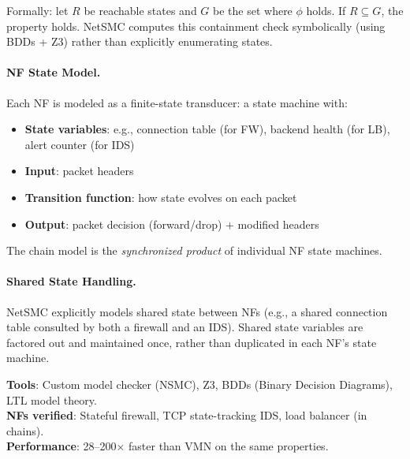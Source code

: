 Formally: let $R$ be reachable states and $G$ be the set where $\phi$ holds. If $R \subseteq G$, the property holds. NetSMC computes this containment check symbolically (using BDDs + Z3) rather than explicitly enumerating states.

\paragraph{NF State Model.}
Each NF is modeled as a finite-state transducer: a state machine with:
\begin{itemize}
  \item \textbf{State variables}: e.g., connection table (for FW), backend health (for LB), alert counter (for IDS)
  \item \textbf{Input}: packet headers
  \item \textbf{Transition function}: how state evolves on each packet
  \item \textbf{Output}: packet decision (forward/drop) + modified headers
\end{itemize}
The chain model is the \emph{synchronized product} of individual NF state machines.

\paragraph{Shared State Handling.}
NetSMC explicitly models shared state between NFs (e.g., a shared connection table consulted by both a firewall and an IDS). Shared state variables are factored out and maintained once, rather than duplicated in each NF's state machine.

\textbf{Tools}: Custom model checker (NSMC), Z3, BDDs (Binary Decision Diagrams), LTL model theory.\\
\textbf{NFs verified}: Stateful firewall, TCP state-tracking IDS, load balancer (in chains).\\
\textbf{Performance}: 28--200$\times$ faster than VMN on the same properties.

